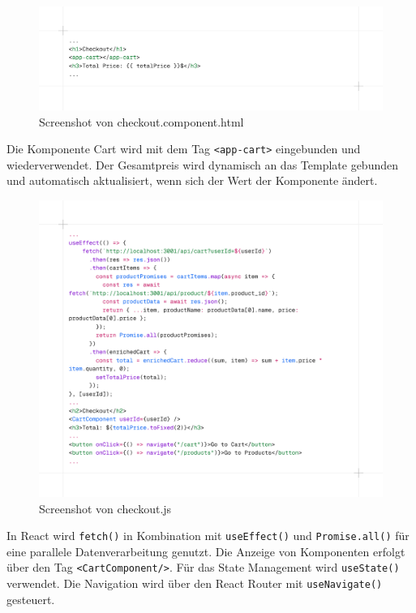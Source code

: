 \documentclass[oneside]{ausarbeitung}
\begin{document}
\begin{figure}[H]
    \centering
    \includegraphics[width=\linewidth]{images/acheckoutcomponenthtml.png}
    \caption{Screenshot von checkout.component.html}
    \label{fig:ahtmlcheckout}
\end{figure}

Die Komponente Cart wird mit dem Tag \texttt{<app-cart>} eingebunden und wiederverwendet. Der Gesamtpreis wird dynamisch an das Template gebunden und automatisch aktualisiert, wenn sich der Wert der Komponente ändert.

\begin{figure}[H]
    \centering
    \includegraphics[width=\linewidth]{images/rcheckout.png}
    \caption{Screenshot von checkout.js}
    \label{fig:rcheckout}
\end{figure}

In React wird \texttt{fetch()} in Kombination mit \texttt{useEffect()} und \texttt{Promise.all()} für eine parallele Datenverarbeitung genutzt. Die Anzeige von Komponenten erfolgt über den Tag \texttt{<CartComponent/>}. Für das State Management wird \texttt{useState()} verwendet. Die Navigation wird über den React Router mit \texttt{useNavigate()} gesteuert.
\end{document}

